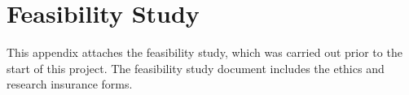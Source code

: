 \chapter{Feasibility Study}
This appendix attaches the feasibility study, which was carried out prior to the start of this project. The feasibility study document includes the ethics and research insurance forms.
